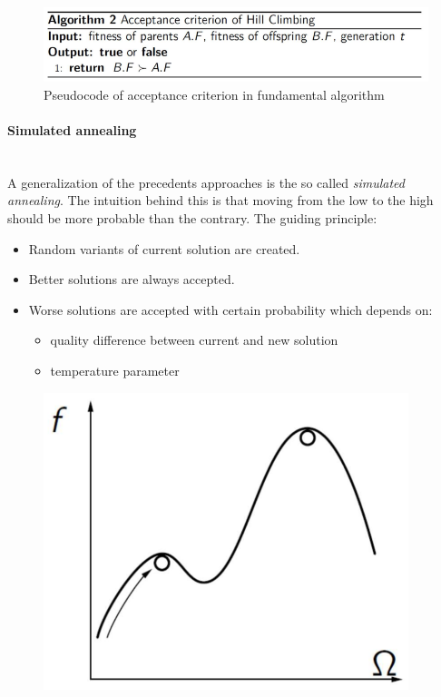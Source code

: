 \documentclass{article}
\begin{document}
\begin{figure}[H]
    \centering
    \includegraphics[scale=0.5]{images/hill_climbing.png}
    \caption{Pseudocode of acceptance criterion in fundamental algorithm}
\end{figure}

\paragraph{Simulated annealing}\mbox{}\\
A generalization of the precedents approaches is the so called \textit{simulated annealing}. The
intuition behind this is that moving from the low to the high should be more probable than the
contrary.
\newline\newline
The guiding principle:
\begin{itemize}
    \item Random variants of current solution are created.
    \item Better solutions are always accepted.
    \item Worse solutions are accepted with certain probability which depends on:
          \begin{itemize}
              \item quality difference between current and new solution
              \item temperature parameter
          \end{itemize}
\end{itemize}
\begin{figure}[H]
    \centering
    \includegraphics[scale=0.5]{images/sim_annealing.png}
\end{figure}
\end{document}
